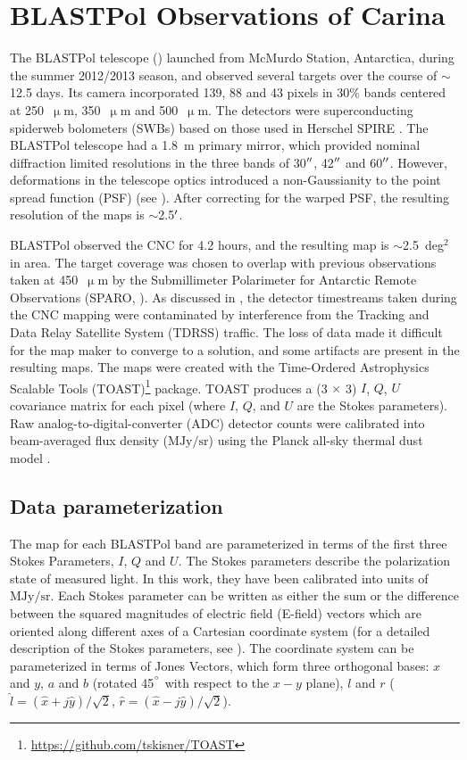 \section{BLASTPol Observations of Carina}\label{observations}
The BLASTPol telescope (\citet{galitzki2014balloon}) launched from McMurdo Station, Antarctica, during the summer 2012/2013 season, and observed several targets over the course of $\sim$12.5 days. Its camera incorporated 139, 88 and 43 pixels in 30$\%$ bands centered at 250~$\upmu$m, 350~$\upmu$m and 500~$\upmu$m. The detectors were superconducting spiderweb bolometers (SWBs) based on those used in Herschel SPIRE \citep{griffin2003spire}.
The BLASTPol telescope had a 1.8~m primary mirror, which provided nominal diffraction limited resolutions in the three bands of 30$\operatorname{^{\prime\prime}}$, 42$\operatorname{^{\prime\prime}}$ and 60$\operatorname{^{\prime\prime}}$. However, deformations in the telescope optics introduced a non-Gaussianity to the point spread function (PSF) (see \citet{fissel2016balloon}). After correcting for the warped PSF, the resulting resolution of the maps is $\sim$2.5$\operatorname{^{\prime}}$.

BLASTPol observed the CNC for 4.2 hours, and the resulting map is $\sim$2.5~deg$^{2}$ in area. The target coverage was chosen to overlap with previous observations taken at 450~$\upmu$m by the Submillimeter Polarimeter for Antarctic Remote Observations (SPARO, \citep{li2006results}). As discussed in \citet{benton2015mapping}, the detector timestreams taken during the CNC mapping were contaminated by interference from the Tracking and Data Relay Satellite System (TDRSS) traffic. The loss of data made it difficult for the map maker to converge to a solution, and some artifacts are present in the resulting maps. The maps were created with the Time-Ordered Astrophysics Scalable Tools (TOAST)\footnote{\url{https://github.com/tskisner/TOAST}} package. TOAST produces a (3 $\times$ 3) $I$, $Q$, $U$ covariance matrix for each pixel (where $I$, $Q$, and $U$ are the Stokes parameters). Raw analog-to-digital-converter (ADC) detector counts were calibrated into beam-averaged flux density ($\mathrm{MJy}/\mathrm{sr}$) using the Planck all-sky thermal dust model \citep{ade2015planck}.

\subsection{Data parameterization}

The map for each BLASTPol band are parameterized in terms of the first three Stokes Parameters, $I$, $Q$ and $U$. The Stokes parameters describe the polarization state of measured light. In this work, they have been calibrated into units of $\mathrm{MJy}/\mathrm{sr}$. Each Stokes parameter can be written as either the sum or the difference between the squared magnitudes of electric field (E-field) vectors which are oriented along different axes of a Cartesian coordinate system (for a detailed description of the Stokes parameters, see \citet{hecht2002optics}). The coordinate system can be parameterized in terms of Jones Vectors, which form three orthogonal bases: $x$ and $y$, $a$ and $b$ (rotated 45$^{\degree}$ with respect to the $x-y$ plane), $l$ and $r$ ($\hat{l} = (\hat{x} + j\hat{y})/\sqrt{2}$, $\hat{r} = (\hat{x} - j\hat{y})/\sqrt{2}$).

